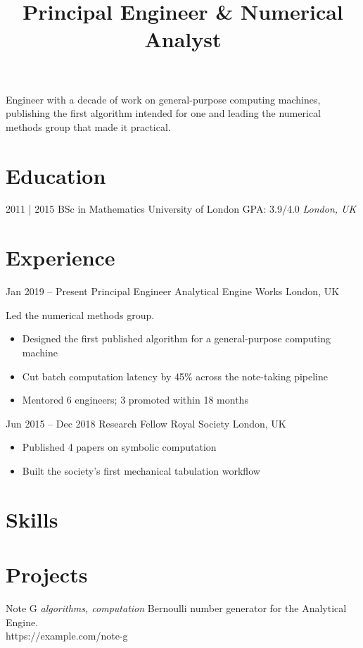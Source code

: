 \documentclass[letterpaper]{moderncv}        %
\title{Principal Engineer \& Numerical Analyst}
\begin{document}
    \makecvtitle
    Engineer with a decade of work on general-purpose computing machines, publishing the first algorithm intended for one and leading the numerical methods group that made it practical.
\medskip
    
\vspace{3pt}
    \section{Education}
    \cventry
{2011 | 2015}
{BSc in Mathematics}
{University of London}
{GPA: 3.9/4.0}
{\textit{London, UK}}
{}
\vspace{3pt}
      \section{Experience}
      \cventry
            {Jan 2019 -- Present}
            {Principal Engineer}
            {Analytical Engine Works}
            {London, UK}
            {}
            {Led the numerical methods group.\endgraf\begin{itemize}%
  \setlength\itemsep{2pt}
  \item Designed the first published algorithm for a general-purpose computing machine
  \item Cut batch computation latency by 45\% across the note-taking pipeline
  \item Mentored 6 engineers; 3 promoted within 18 months
\end{itemize}}
      \cventry
            {Jun 2015 -- Dec 2018}
            {Research Fellow}
            {Royal Society}
            {London, UK}
            {}
            {\begin{itemize}%
  \setlength\itemsep{2pt}
  \item Published 4 papers on symbolic computation
  \item Built the society's first mechanical tabulation workflow
\end{itemize}}
\vspace{3pt}
\section{Skills}
\vspace{3pt}
      \section{Projects}
      \cventry
  {}
  {Note G}
  {}
  {\textit{algorithms, computation}}
  {}
  {Bernoulli number generator for the Analytical Engine.\\https://example.com/note-g}
\vspace{1mm}
\vspace{3pt}
\end{document}
